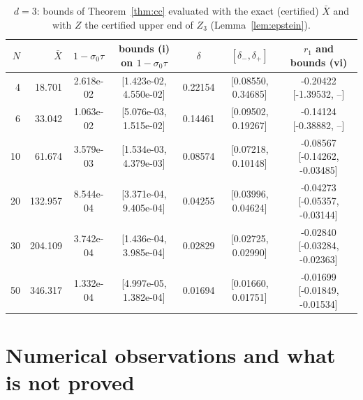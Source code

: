 \documentclass[11pt,a4paper]{article}
\newcommand{\Xb}{\bar X}
\theoremstyle{plain}
\theoremstyle{definition}
\numberwithin{equation}{section}
\begin{document}
\begin{table}[ht]\centering\footnotesize
\begin{tabular}{rrccccc}\toprule
$N$ & $\Xb$ & $1-\sigma_0\tau$ & bounds (i) on $1-\sigma_0\tau$ & $\delta$ & $[\delta_-,\delta_+]$ & $r_1$ and bounds (vi)\\\midrule
4 & 18.701 & 2.618e-02 & [1.423e-02, 4.550e-02] & 0.22154 & [0.08550, 0.34685] & -0.20422 [-1.39532, --]\\
6 & 33.042 & 1.063e-02 & [5.076e-03, 1.515e-02] & 0.14461 & [0.09502, 0.19267] & -0.14124 [-0.38882, --]\\
10 & 61.674 & 3.579e-03 & [1.534e-03, 4.379e-03] & 0.08574 & [0.07218, 0.10148] & -0.08567 [-0.14262, -0.03485]\\
20 & 132.957 & 8.544e-04 & [3.371e-04, 9.405e-04] & 0.04255 & [0.03996, 0.04624] & -0.04273 [-0.05357, -0.03144]\\
30 & 204.109 & 3.742e-04 & [1.436e-04, 3.985e-04] & 0.02829 & [0.02725, 0.02990] & -0.02840 [-0.03284, -0.02363]\\
50 & 346.317 & 1.332e-04 & [4.997e-05, 1.382e-04] & 0.01694 & [0.01660, 0.01751] & -0.01699 [-0.01849, -0.01534]\\
\bottomrule\end{tabular}
\caption{$d=3$: bounds of Theorem~\ref{thm:cc} evaluated with the exact (certified) $\Xb$ and with $Z$ the certified upper end of $Z_3$ (Lemma~\ref{lem:epstein}).}\label{tab:cc3x}\end{table}


\section{Numerical observations and what is not proved}\label{sec:gaps}
\end{document}
